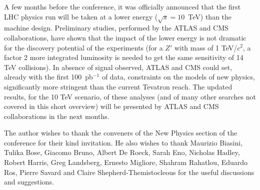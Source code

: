 \documentclass{cimento}
\begin{document}
A few months before the conference, it was officially announced 
that the first LHC physics run will be taken at a lower energy 
($\sqrt{s} = 10$~TeV) than the machine design. Preliminary 
studies, performed by the ATLAS and CMS collaborations, 
have shown that the impact of the lower energy is not dramatic for the 
discovery potential of the experiments (for a $Z'$ with mass of 1 TeV/$c^2$, 
a factor 2 more integrated luminosity is needed to get the same 
sensitivity of 14 TeV collisions). 
In absence of signal observed, ATLAS and CMS could set, already with the 
first 100~pb$^{-1}$ of data, constraints on the models of new physics, 
significantly more stringent than the current Tevatron reach. 
The updated results, for the 10 TeV scenario, of these analyses (and of 
many other searches not covered in this short overview) 
will be presented by ATLAS and CMS collaborations 
in the next months.


\acknowledgments
The author wishes to thank the conveners of the New Physics 
section of the conference for their kind invitation. 
He also wishes to thank Maurizio Biasini, Tulika Bose, Giacomo Bruno, Albert De Roeck, Sarah Eno, Nicholas Hadley, Robert Harris, 
Greg Landsberg, Ernesto Migliore, Shahram Rahatlou, Eduardo Ros, Pierre Savard and Claire 
Shepherd-Themistocleous  for the useful discussions and suggestions.
\end{document}
